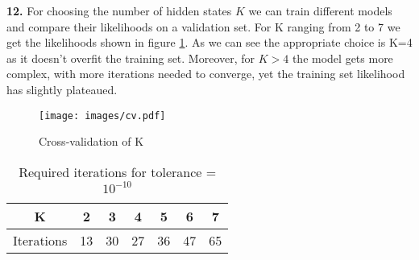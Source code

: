\documentclass[11pt]{article}
\newcommand{\1}{\mathbbm{1}}
\newcommand{\0}{\mathbf{0}}
\begin{document}
\textbf{12.} For choosing the number of hidden states $K$ we can train different models and compare their likelihoods on a validation set. For K ranging from 2 to 7 we get the likelihoods shown in figure \ref{cv}. As we can see the appropriate choice is K=4 as it doesn't overfit the training set. Moreover, for $K>4$ the model gets more complex, with more iterations needed to converge, yet the training set likelihood has slightly plateaued.
\begin{figure}[H]
    \centering
    \texttt{[image: images/cv.pdf]}
    \caption{Cross-validation of K\label{cv}}
\end{figure}
\begin{table}[H]
\centering
\begin{tabular}{|c|c|c|c|c|c|c|}
\hline
K&2&3&4&5&6&7\\
\hline
Iterations&13  &  30 &   27  &  36    &47    &65\\
\hline
\end{tabular}
\caption{Required iterations for tolerance = $10^{-10}$}

\end{table}
\end{document}
